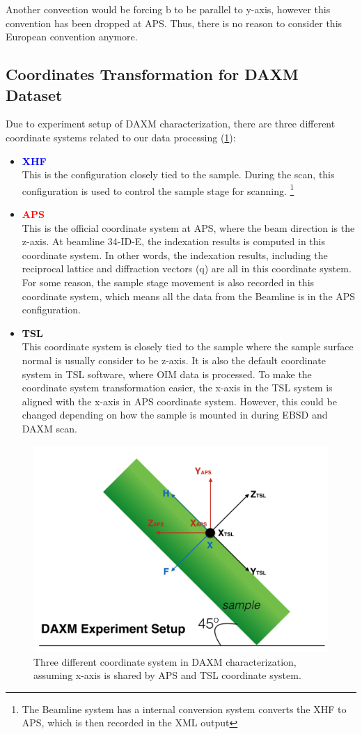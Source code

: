 \documentclass[12pt]{scrartcl}
\begin{document}
Another convection would be forcing \vctr b to be parallel to y-axis, however this convention has been dropped at APS.
Thus, there is no reason to consider this European convention anymore.

\subsection{Coordinates Transformation for DAXM Dataset}
\label{sec:coord}
Due to experiment setup of DAXM characterization, there are three different coordinate systems related to our data processing (\cref{fig:daxmcoord}):
\begin{itemize}
\item \textcolor{blue}{\textbf{XHF}} \\
This is the configuration closely tied to the sample.
During the scan, this configuration is used to control the sample stage for scanning. 
\footnote{The Beamline system has a internal conversion system converts the XHF to APS, which is then recorded in the XML output}

\item \textcolor{red}{\textbf{APS}} \\
This is the official coordinate system at APS, where the beam direction is the z-axis.
At beamline 34-ID-E, the indexation results is computed in this coordinate system.
In other words, the indexation results, including the reciprocal lattice and diffraction vectors (\tnsr q) are all in this coordinate system.
For some reason, the sample stage movement is also recorded in this coordinate system, which means all the data from the Beamline is in the APS configuration.

\item \textcolor{black}{\textbf{TSL}} \\
This coordinate system is closely tied to the sample where the sample surface normal is usually consider to be z-axis.
It is also the default coordinate system in TSL software, where OIM data is processed.
To make the coordinate system transformation easier, the x-axis in the TSL system is aligned with the x-axis in APS coordinate system.
However, this could be changed depending on how the sample is mounted in during EBSD and DAXM scan.

\end{itemize}

\begin{figure}[htp]
\centering
\includegraphics[width=.7\linewidth]{daxmcoord.png}
\caption{Three different coordinate system in DAXM characterization, assuming x-axis is shared by APS and TSL coordinate system.}
\label{fig:daxmcoord}
\end{figure}
\end{document}

